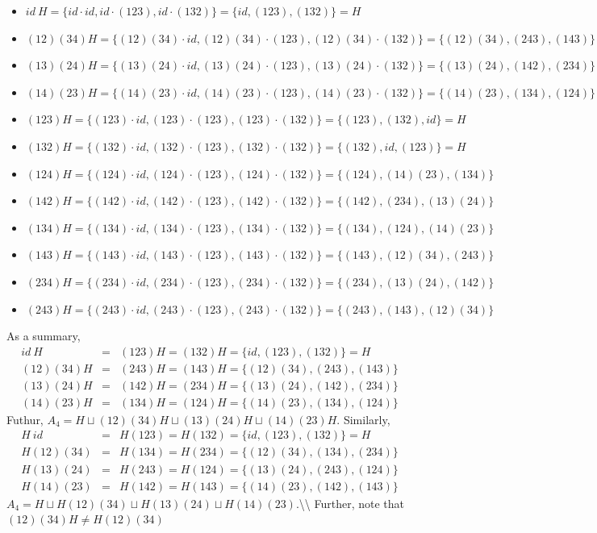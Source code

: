 \documentclass[
]{book}
\providecommand{\tightlist}{%
  \setlength{\itemsep}{0pt}\setlength{\parskip}{0pt}}
\theoremstyle{definition}
\theoremstyle{definition}
\theoremstyle{definition}
\theoremstyle{definition}
\theoremstyle{remark}
\begin{document}
\begin{itemize}
\tightlist
\item
  \(id ~H = \{ id \cdot id, id \cdot (123), id \cdot (132)\} = \{ id, (123), (132) \}=H\)
\item
  \((12)(34)H = \{ (12)(34) \cdot id, (12)(34) \cdot (123), (12)(34) \cdot (132)\}=\{(12)(34),(2 4 3),(1 4 3)\}\)
\item
  \((13)(24)H = \{ (13)(24) \cdot id, (13)(24) \cdot (123), (13)(24) \cdot (132)\}= \{(13)(24),(142),(234)\}\)
\item
  \((14)(23)H = \{ (14)(23) \cdot id, (14)(23) \cdot (123), (14)(23) \cdot (132)\}=\{(14)(23),(134),(1 2 4)\}\)
\item
  \((123)H = \{ (123) \cdot id, (123) \cdot (123), (123) \cdot (132)\} =\{(123),(132),id\}=H\)
\item
  \((132)H = \{ (132) \cdot id, (132) \cdot (123), (132) \cdot (132)\} =\{(132),id,(123)\}= H\)
\item
  \((124)H = \{ (124) \cdot id, (124) \cdot (123), (124) \cdot (132)\}=\{(124),(14)(23),(134)\}\)
\item
  \((142)H = \{ (142) \cdot id, (142) \cdot (123), (142) \cdot (132)\}=\{(142),(234),(13)(24)\}\)
\item
  \((134)H = \{ (134) \cdot id, (134) \cdot (123), (134) \cdot (132)\}=\{(134),(124),(14)(23)\}\)
\item
  \((143)H = \{ (143) \cdot id, (143) \cdot (123), (143) \cdot (132)\}=\{(143),(12)(34),(243)\}\)
\item
  \((234)H = \{ (234) \cdot id, (234) \cdot (123), (234) \cdot (132)\}=\{(234),(13)(24),(142)\}\)
\item
  \((243)H = \{ (243) \cdot id, (243) \cdot (123), (243) \cdot (132)\}=\{(243),(143),(12)(34)\}\)
\end{itemize}

As a summary,
\begin{eqnarray*}
    id~H&=&(123)H=(132)H=\{id,(123),(132)\}=H\\
    (12)(34)H&=&(243)H=(143)H=\{(12)(34),(243),(143)\}\\
    (13)(24)H&=&(142)H=(234)H=\{(13)(24),(142),(234)\}\\
    (14)(23)H&=&(134)H=(124)H=\{(14)(23),(134),(124)\}
\end{eqnarray*}
Futhur, \(A_4=H\sqcup(12)(34)H\sqcup(13)(24)H\sqcup(14)(23)H\).
Similarly,
\begin{eqnarray*}
    H~id&=&H(123)=H(132)=\{ id, (123), (132) \}=H\\
    H(12)(34)&=& H (134)= H(234)=\{(12)(34),(134),(234)\}\\
    H(13)(24)&=&H(243)=H(124)=\{(13)(24),(243),(124)\}\\
    H(14)(23)&=&H(142)=H(143)=\{(14)(23),(142),(143)\}
\end{eqnarray*}
\(A_4=H\sqcup H(12)(34)\sqcup H (13)(24)\sqcup H(14)(23)\).\textbackslash\textbackslash{}
Further, note that \((12)(34)H\neq H(12)(34)\)
\end{document}
